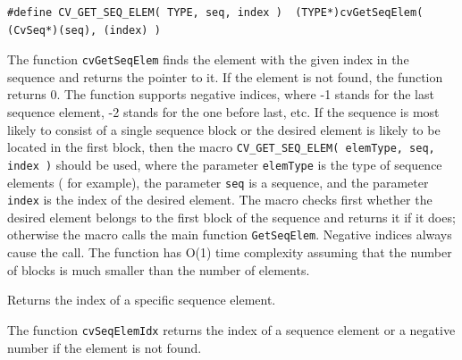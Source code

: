 \begin{lstlisting}
#define CV_GET_SEQ_ELEM( TYPE, seq, index )  (TYPE*)cvGetSeqElem( (CvSeq*)(seq), (index) )
\end{lstlisting}

\begin{description}
\end{description}


The function \texttt{cvGetSeqElem} finds the element with the given
index in the sequence and returns the pointer to it. If the element
is not found, the function returns 0. The function supports negative
indices, where -1 stands for the last sequence element, -2 stands for
the one before last, etc. If the sequence is most likely to consist of
a single sequence block or the desired element is likely to be located
in the first block, then the macro
\texttt{CV\_GET\_SEQ\_ELEM( elemType, seq, index )}
should be used, where the parameter \texttt{elemType} is the
type of sequence elements (  for example), the parameter
\texttt{seq} is a sequence, and the parameter \texttt{index} is the index
of the desired element. The macro checks first whether the desired element
belongs to the first block of the sequence and returns it if it does;
otherwise the macro calls the main function \texttt{GetSeqElem}. Negative
indices always cause the  call. The function has O(1)
time complexity assuming that the number of blocks is much smaller than the
number of elements.

\label{SeqElemIdx}

Returns the index of a specific sequence element.


\begin{description}
\end{description}

The function \texttt{cvSeqElemIdx} returns the index of a sequence element or a negative number if the element is not found.


